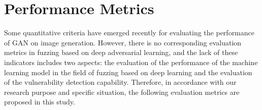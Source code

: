 \section{Performance Metrics}
Some quantitative criteria \cite{heusel2017gans} \cite{lucic2018gans} %
have emerged recently for evaluating the performance of GAN on image generation. However, there is no corresponding evaluation metrics in fuzzing based on deep adversarial learning, and the lack of these indicators includes two aspects: the evaluation of the performance of the machine learning model \cite{karras2017progressive} in the field of fuzzing based on deep learning \cite{shmelkov2018good} and the evaluation of the vulnerability detection capability. Therefore, in accordance with our research purpose and specific situation, the following evaluation metrics are proposed in this study.


